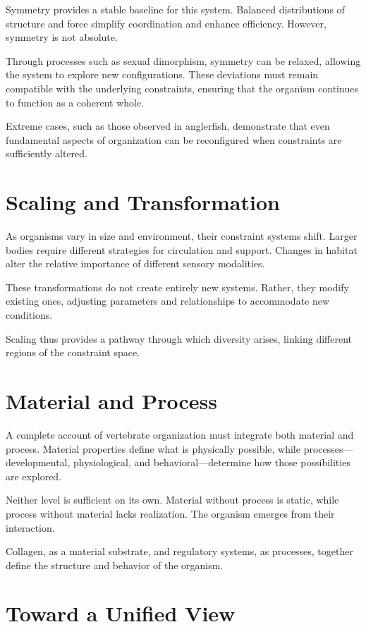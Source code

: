 \documentclass[11pt,oneside]{book}
\begin{document}
Symmetry provides a stable baseline for this system. Balanced distributions of structure and force simplify coordination and enhance efficiency. However, symmetry is not absolute.

Through processes such as sexual dimorphism, symmetry can be relaxed, allowing the system to explore new configurations. These deviations must remain compatible with the underlying constraints, ensuring that the organism continues to function as a coherent whole.

Extreme cases, such as those observed in anglerfish, demonstrate that even fundamental aspects of organization can be reconfigured when constraints are sufficiently altered.

\section{Scaling and Transformation}

As organisms vary in size and environment, their constraint systems shift. Larger bodies require different strategies for circulation and support. Changes in habitat alter the relative importance of different sensory modalities.

These transformations do not create entirely new systems. Rather, they modify existing ones, adjusting parameters and relationships to accommodate new conditions.

Scaling thus provides a pathway through which diversity arises, linking different regions of the constraint space.

\section{Material and Process}

A complete account of vertebrate organization must integrate both material and process. Material properties define what is physically possible, while processes—developmental, physiological, and behavioral—determine how those possibilities are explored.

Neither level is sufficient on its own. Material without process is static, while process without material lacks realization. The organism emerges from their interaction.

Collagen, as a material substrate, and regulatory systems, as processes, together define the structure and behavior of the organism.

\section{Toward a Unified View}
\end{document}
